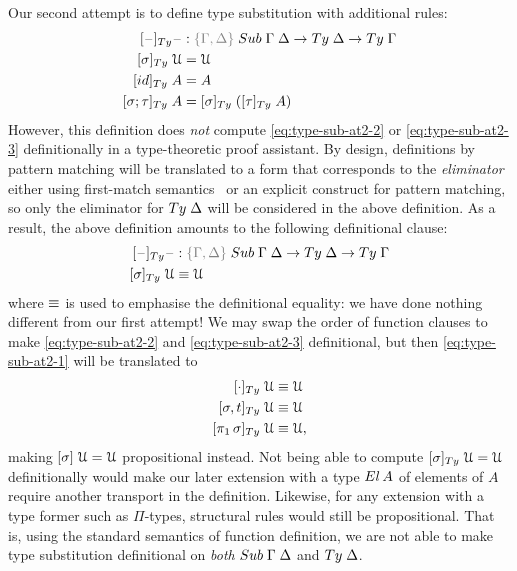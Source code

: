 \documentclass[a4paper,UKenglish,numberwithinsect,cleveref,thm-restate]{lipics-v2021}
\newcommand{\LT}[2][]{\todo[inline,author={L-T},caption={},#1]{#2}}
\begin{document}
Our second attempt is to define type substitution with additional rules:
\begin{alignat}{3}
[\blank]_{\Ty} \blank &: \implicit{\Gamma, \Delta} \; \Sub\;\Gamma\;\Delta \to \Ty\;\Delta \to \Ty\;\Gamma \nonumber \\
[ \sigma ]_{\Ty}       \;\UU  & = \UU                                   \label{eq:type-sub-at2-1} \\
[ \idS ]_{\Ty}         \;A    & = A                                     \label{eq:type-sub-at2-2} \\
[ \sigma ; \tau ]_{\Ty}\;A    & = [ \sigma ]_{\Ty}\;([ \tau ]_{\Ty}\;A) \label{eq:type-sub-at2-3}
\end{alignat}
However, this definition does \emph{not} compute \eqref{eq:type-sub-at2-2} or \eqref{eq:type-sub-at2-3} definitionally in a type-theoretic proof assistant.
By design, definitions by pattern matching will be translated to a form that corresponds to the \emph{eliminator} either using first-match semantics~\cite{Cockx2020a} or an explicit construct for pattern matching, so only the eliminator for $\Ty\;\Delta$ will be considered in the above definition.
\LT[noinline]{How about \Coq and \Lean?}
As a result, the above definition amounts to the following definitional clause:
\begin{alignat*}{3}
[\blank]_{\Ty} \blank &: \implicit{\Gamma, \Delta} \; \Sub\;\Gamma\;\Delta \to \Ty\;\Delta \to \Ty\;\Gamma \\
[ \sigma ]_{\Ty}\;\UU  & \judgeq \UU
\end{alignat*}
where $\equiv$ is used to emphasise the definitional equality: we have done nothing different from our first attempt! 
We may swap the order of function clauses to make \eqref{eq:type-sub-at2-2} and \eqref{eq:type-sub-at2-3} definitional, but then \eqref{eq:type-sub-at2-1} will be translated to 
\begin{alignat*}{3}
[ \emptysub ]_{\Ty}\;\UU         & \judgeq \UU \\
[ \sigma, t ]_{\Ty}\;\UU         & \judgeq \UU \\
[ \pi_1\,\sigma ]_{\Ty}\;\UU     & \judgeq \UU,
\end{alignat*}
making $[\sigma]\;\mathcal{U} = \mathcal{U}$ propositional instead.
Not being able to compute $[ \sigma ]_{\Ty}\;\UU = \UU$ definitionally would make our later extension with a type $\El\,A$ of elements of $A$ require another transport in the definition.
Likewise, for any extension with a type former such as $\Pi$-types, structural rules would still be propositional.
That is, using the standard semantics of function definition, we are not able to make type substitution definitional on \emph{both} $\Sub\;\Gamma\;\Delta$ and $\Ty\;\Delta$.
\end{document}
